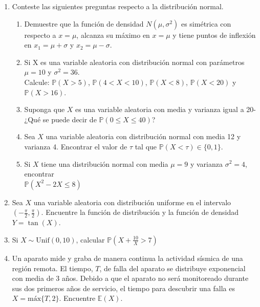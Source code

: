 \documentclass[11pt,a4paper]{report}
\begin{document}
\begin{enumerate}
		\item{
			Conteste las siguientes preguntas respecto a la distribución normal.
			\begin{enumerate}
				\item {
					Demuestre que la función de densidad $N(\mu, \sigma^2)$ es
                    simétrica con respecto a $x = \mu$, alcanza su máximo en
                    $x = \mu$ y tiene puntos de inflexión en $x_1= \mu + \sigma$
                    y $x_2 = \mu - \sigma$.
				}

				\item {
					Si X es una variable aleatoria con distribución normal con
                    parámetros $\mu = 10$ y $\sigma^2 = 36$.\\
                    Calcule: $\mathbb{P}(X > 5)$, $\mathbb{P}(4 < X < 10)$,
                    $\mathbb{P}(X < 8)$, $\mathbb{P}(X < 20)$ y
                    $\mathbb{P}(X > 16)$.
				}

				\item {
					Suponga que $X$ es una variable aleatoria con media y
					varianza igual a 20- ¿Qué se puede decir de
					$\mathbb{P}(0 \leq X \leq 40)$?
				}

				\item {
					Sea $X$ una variable aleatoria con distribución normal con
					media 12 y varianza 4. Encontrar el valor de $\tau$ tal que
					$\mathbb{P}(X < \tau) \in \{0,1\}$.
				}

				\item {
					Si $X$ tiene una distribución normal con media $\mu = 9$ y
					varianza $\sigma^2 = 4$, encontrar \\
					$\mathbb{P}(X^2 - 2X \leq 8)$
				}
			\end{enumerate}
		}

		\item{
			Sea $X$ una variable aleatoria con distribución uniforme en el
			intervalo $(-\frac{\pi}{2}, \frac{\pi}{2})$. Encuentre la función de
			distribución y la función de densidad $Y = \tan(X)$.
		}

		\item{
			Si $X \sim \text{Unif}(0, 10)$, calcular
			$\mathbb{P}(X + \frac{10}{X} > 7)$
		}

		\item{
			Un aparato mide y graba de manera continua la actividad sísmica de
			una región remota. El tiempo, $T$, de falla del aparato se
			distribuye exponencial con media de 3 años. Debido a que el aparato
			no será monitoreado durante sus dos primeros años de servicio, el
			tiempo para descubrir una falla es $X = \text{máx}\{T,2\}$.
			Encuentre $\mathbb{E}(X)$.
		}


\end{enumerate}
\end{document}
